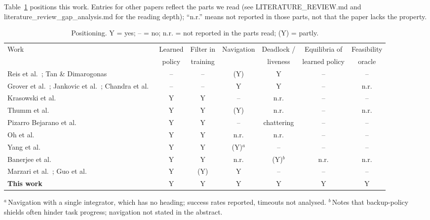 \documentclass[11pt]{article}
\theoremstyle{definition}
\theoremstyle{remark}
\begin{document}
Table~\ref{tab:related} positions this work. Entries for other papers reflect the parts we read (see LITERATURE\_REVIEW.md and literature\_review\_gap\_analysis.md for the reading depth); ``n.r.'' means not reported in those parts, not that the paper lacks the property.

\begin{table}[t]
\centering\small
\caption{Positioning. Y = yes; -- = no; n.r. = not reported in the parts read; (Y) = partly.}
\label{tab:related}
\begin{tabularx}{\linewidth}{@{}Xcccccc@{}}
\toprule
Work & Learned & Filter in & Navigation & Deadlock / & Equilibria of & Feasibility \\
 & policy & training & & liveness & learned policy & oracle \\
\midrule
Reis et al.~\cite{reis2021undesired}; Tan \& Dimarogonas~\cite{tan2024undesired} & -- & -- & (Y) & Y & -- & -- \\
Grover et al.~\cite{grover2023deadlock}; Jankovic et al.~\cite{jankovic2024liveness}; Chandra et al.~\cite{chandra2025deadlock} & -- & -- & Y & Y & -- & n.r. \\
Krasowski et al.~\cite{krasowski2023provably} & Y & Y & -- & n.r. & -- & -- \\
Thumm et al.~\cite{thumm2023reducing} & Y & Y & (Y) & n.r. & -- & n.r. \\
Pizarro Bejarano et al.~\cite{pizarro2025filtering} & Y & Y & -- & chattering & -- & -- \\
Oh et al.~\cite{oh2026optimal} & Y & Y & n.r. & n.r. & -- & -- \\
Yang et al.~\cite{yang2026cbfrl} & Y & Y & (Y)$^{a}$ & -- & -- & -- \\
Banerjee et al.~\cite{banerjee2024dmps} & Y & Y & n.r. & (Y)$^{b}$ & n.r. & n.r. \\
Marzari et al.~\cite{marzari2025probabilistic}; Guo et al.~\cite{guo2025radar} & Y & (Y) & Y & -- & -- & -- \\
\textbf{This work} & Y & Y & Y & Y & Y & Y \\
\bottomrule
\end{tabularx}
\par\smallskip\raggedright\footnotesize $^{a}$\,Navigation with a single integrator, which has no heading; success rates reported, timeouts not analysed. $^{b}$\,Notes that backup-policy shields often hinder task progress; navigation not stated in the abstract.
\end{table}

\end{document}
